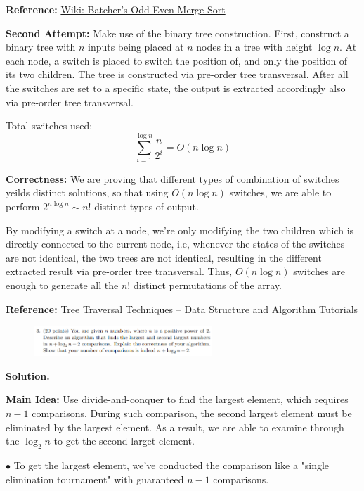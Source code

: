 \documentclass[10pt]{article}
\begin{document}
\textbf{Reference:} \href{https://en.wikipedia.org/wiki/Batcher_odd%E2%80%93even_mergesort}{Wiki: Batcher's Odd Even Merge Sort}

\textbf{Second Attempt:} Make use of the binary tree construction. First, construct a binary tree with $n$ inputs being placed at $n$ nodes in a tree with height $\log n$. At each node, a switch is placed to switch the position of, and only the position of its two children. The tree is constructed via pre-order tree transversal. After all the switches are set to a specific state, the output is extracted accordingly also via pre-order tree transversal.

Total switches used:
$$
\sum_{i=1}^{\log n} \frac{n}{2^i} = O(n\log n)
$$

\textbf{Correctness:} We are proving that different types of combination of switches yeilds distinct solutions, so that using $O(n\log n)$ switches, we are able to perform $2^{n\log n} \sim n!$ distinct types of output.

By modifying a switch at a node, we're only modifying the two children which is directly connected to the current node, i.e, whenever the states of the switches are not identical, the two trees are not identical, resulting in the different extracted result via pre-order tree transversal. Thus, $O(n\log n)$ switches are enough to generate all the $n!$ distinct permutations of the array.

\textbf{Reference:}
\href{https://www.geeksforgeeks.org/tree-traversals-inorder-preorder-and-postorder/}{Tree Traversal Techniques – Data Structure and Algorithm Tutorials}

\newpage

\begin{figure}[h]
	\centering
	\includegraphics[width=0.6\textwidth]{hw2-3}
\end{figure}

\textbf{Solution.}

\textbf{Main Idea:} Use divide-and-conquer to find the largest element, which requires $n-1$ comparisons. During such comparison, the second largest element must be eliminated by the largest element. As a result, we are able to examine through the $\log_2 n$ to get the second larget element.

$\bullet$ To get the largest element, we've conducted the comparison like a "single elimination tournament" with guaranteed $n-1$ comparisons.
\end{document}
